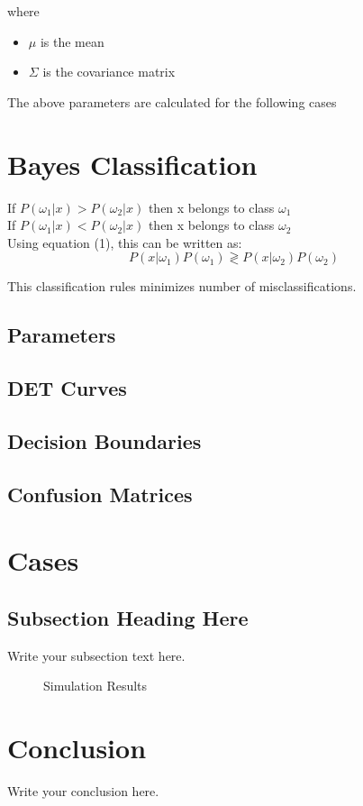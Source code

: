 \documentclass[11pt,a4paper]{article}
\begin{document}
 where
 \begin{itemize}
 	\item $\mu$ is the mean 
 	\item $\Sigma$ is the covariance matrix
 \end{itemize}
 
 The above parameters are calculated for the following cases 

 
\section{Bayes Classification}

If $P(\omega_1 | x) > P(\omega_2 | x)$ then x belongs to class $\omega_1$
\\If $P(\omega_1 | x) < P(\omega_2 | x)$ then x belongs to class $\omega_2$\\

Using equation (1), this can be written as:
 \begin{equation}
 {P(x| \omega_1)P(\omega_1) \gtrless P(x | \omega_2)P(\omega_2)}
 \end{equation}

This classification rules minimizes number of misclassifications. 
\subsection{Parameters}
\subsection{DET Curves}
\subsection{Decision Boundaries}
\subsection{Confusion Matrices}

\section{Cases}
\subsection{Subsection Heading Here}
Write your subsection text here.

\begin{figure}
    \centering
    \caption{Simulation Results}
    \label{simulationfigure}
\end{figure}

\section{Conclusion}
Write your conclusion here.
\end{document}
